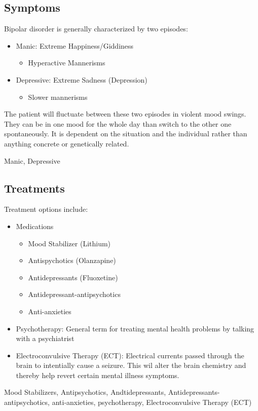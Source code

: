 \documentclass[journal]{IEEEtran}
\begin{document}
\subsection{Symptoms}
Bipolar disorder is generally characterized by two episodes:
\\
\begin{itemize}
\item Manic: Extreme Happiness/Giddiness
\begin{itemize}
\item Hyperactive Mannerisms
\end{itemize}
\item Depressive: Extreme Sadness (Depression)
\begin{itemize}
\item Slower mannerisms
\end{itemize}
\end{itemize}
\vspace{2 mm}
The patient will fluctuate between these two episodes in violent mood swings. They can be in one mood for the whole day than switch to the other one spontaneously. It is dependent on the situation and the individual rather than anything concrete or genetically related.
\begin{IEEEkeywords}
Manic, Depressive
\end{IEEEkeywords}
\subsection{Treatments}
Treatment options include:
\begin{itemize}
\item Medications
\begin{itemize}
\item Mood Stabilizer (Lithium)
\item Antispychotics (Olanzapine)
\item Antidepressants (Fluoxetine)
\item Antidepressant-antipsychotics
\item Anti-anxieties
\end{itemize}
\item Psychotherapy: General term for treating mental health problems by talking with a psychiatrist
\item Electroconvulsive Therapy (ECT): Electrical currents passed through the brain to intentially cause a seizure. This wil alter the brain chemistry and thereby help revert certain mental illness symptoms.
\end{itemize}
\begin{IEEEkeywords}
Mood Stabilizers, Antipsychotics, Andtidepressants, Antidepressants-antipsychotics, anti-anxieties, psychotherapy, Electroconvulsive Therapy (ECT)
\end{IEEEkeywords}
\end{document}
